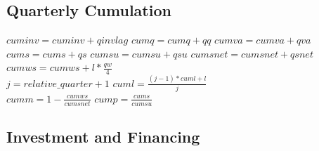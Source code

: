 \documentclass{article}
\begin{document}
\clearpage
\subsection{Quarterly Cumulation}

\begin{algorithm}[H]
\caption{Quarterly Cum}
    \begin{algorithmic}
        \State \(cuminv = cuminv + qinvlag\)
        \State \(cumq = cumq + qq\)
        \State \(cumva = cumva + qva\)
        \State \(cums = cums + qs\)
        \State \(cumsu = cumsu + qsu\)
        \State \(cumsnet = cumsnet + qsnet\)
        \State \(cumws = cumws + l * \frac{qw}{4}\)
        \\
        \State \(j = relative\_quarter + 1 \)
        \State \(cuml = \frac{(j - 1) * cuml + l}{j}\)
        \\
        \State \(cumm = 1 - \frac{cumws}{cumsnet}\)
        \State \(cump = \frac{cums}{cumsu}\)
        \EndFunction
    \end{algorithmic}
\end{algorithm}

\clearpage
\subsection{Investment and Financing}
\end{document}
